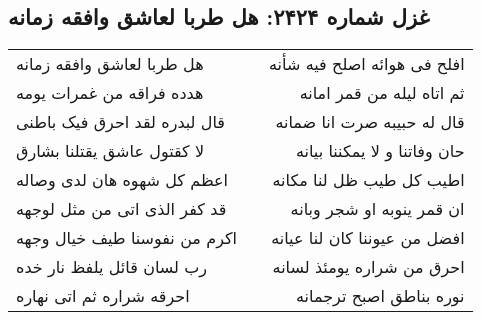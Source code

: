 \begin{center}
\section*{غزل شماره ۲۴۲۴: هل طربا لعاشق وافقه زمانه}
\label{sec:2424}
\begin{longtable}{l p{0.5cm} r}
هل طربا لعاشق وافقه زمانه
&&
افلح فی هوائه اصلح فیه شأنه
\\
هدده فراقه من غمرات یومه
&&
ثم اتاه لیله من قمر امانه
\\
قال لبدره لقد احرق فیک باطنی
&&
قال له حبیبه صرت انا ضمانه
\\
لا کقتول عاشق یقتلنا بشارق
&&
حان وفاتنا و لا یمکننا بیانه
\\
اعظم کل شهوه هان لدی وصاله
&&
اطیب کل طیب ظل لنا مکانه
\\
قد کفر الذی اتی من مثل لوجهه
&&
ان قمر ینوبه او شجر وبانه
\\
اکرم من نفوسنا طیف خیال وجهه
&&
افضل من عیوننا کان لنا عیانه
\\
رب لسان قائل یلفظ نار خده
&&
احرق من شراره یومئذ لسانه
\\
احرقه شراره ثم اتی نهاره
&&
نوره بناطق اصبح ترجمانه
\\
\end{longtable}
\end{center}
